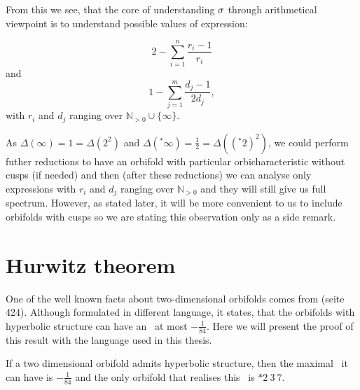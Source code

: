 From this we see, that the core of understanding ${\sigma}$ through arithmetical viewpoint 
is to understand possible values of expression:

\begin{equation}\label{S2_sum}
2 - \sum_{i=1}^n \frac{r_i-1}{r_i}
\end{equation}
and 
\begin{equation}\label{D2_sum}
1 - \sum_{j=1}^m \frac{d_j-1}{2d_j},
\end{equation}
with $r_i$ and $d_j$ ranging over $\mathbb{N}_{>0}\cup \{\infty\}$.

As $\Delta(\infty) = 1 = \Delta(2^2)$ and $\Delta(^*\infty) = \frac{1}{2} = \Delta((^*2)^2)$, 
we could perform futher reductions to have an orbifold with 
particular orbicharacteristic without cusps (if needed) and then (after these reductions) 
we can analyse only expressions with $r_i$ and $d_j$ ranging over $\mathbb{N}_{>0}$ and 
they will still give us full spectrum. 
However, as stated later, it will be more convenient to us to include orbifolds with cusps 
so we are stating this observation only as a side remark.

\section{Hurwitz theorem}\label{największy orbifold}
One of the well known facts about two-dimensional orbifolds comes from \cite{Hurwitz1893} 
(seite 424).
Although formulated in different language, it states, that the orbifolds 
with hyperbolic structure can have an \Eoc\ at most $-\frac{1}{84}$. 
Here we will present the proof of this result with the language used in this thesis.
\begin{theorem}
If a two dimensional orbifold admits hyperbolic structure, then the maximal \Eoc\ it can 
have is $-\frac{1}{84}$ and the only orbifold that realises this \Eoc\ is $*2\ 3\ 7$.
\end{theorem}
